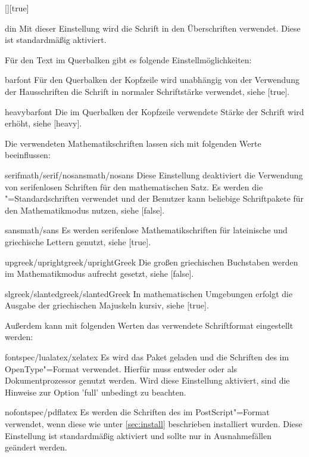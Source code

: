 \begin{Declaration}{[\PSet]}[true]
\begin{values}
\item[din]
  Mit dieser Einstellung wird die Schrift \DIN in den Überschriften verwendet. 
  Diese ist standardmäßig aktiviert.
\end{values}
%
Für den Text im Querbalken gibt es folgende Einstellmöglichkeiten:
%
\begin{values}
\item[barfont]
  Für den Querbalken der Kopfzeile wird unabhängig von der Verwendung der 
  Hausschriften die Schrift \Univers in normaler Schriftstärke verwendet,
  siehe [true].
\item[heavybarfont]
  Die im Querbalken der Kopfzeile verwendete Stärke der Schrift \Univers wird 
  erhöht, siehe [heavy].
\end{values}
%
Die verwendeten Mathematikschriften lassen sich mit folgenden Werte 
beeinflussen:
%
\begin{values}
\item[serifmath/serif/nosansmath/nosans]  
  Diese Einstellung deaktiviert die Verwendung von serifenlosen Schriften für 
  den mathematischen Satz. Es werden die "=Standardschriften 
  verwendet und der Benutzer kann beliebige Schriftpakete für den 
  Mathematikmodus nutzen, siehe [false].
\item[sansmath/sans]
  Es werden serifenlose Mathematikschriften für lateinische und griechische 
  Lettern genutzt, siehe [true].
\item[upgreek/uprightgreek/uprightGreek]
  Die großen griechischen Buchstaben werden im Mathematikmodus aufrecht gesetzt,
  siehe [false].
\item[slgreek/slantedgreek/slantedGreek]
  In mathematischen Umgebungen erfolgt die Ausgabe der griechischen Majuskeln 
  kursiv, siehe [true].
\end{values}
%
Außerdem kann mit folgenden Werten das verwendete Schriftformat eingestellt 
werden: 
%
\begin{values}
\item[fontspec/lualatex/xelatex]
  Es wird das Paket  geladen und die Schriften des \CDs im 
  OpenType"=Format verwendet. Hierfür muss entweder  oder 
   als Dokumentprozessor genutzt werden. Wird diese Einstellung 
  aktiviert, sind die Hinweise zur Option 'full' unbedingt 
  zu beachten.
\item[nofontspec/pdflatex]
  Es werden die Schriften des \CDs im PostScript"=Format verwendet, wenn diese 
  wie unter \autoref{sec:install} beschrieben installiert wurden. Diese 
  Einstellung ist standardmäßig aktiviert und sollte nur in Ausnahmefällen 
  geändert werden.
\end{values}
\end{Declaration}

